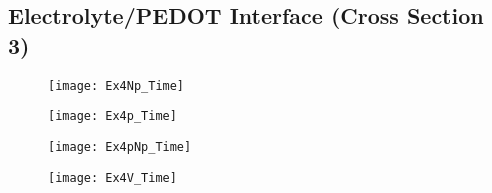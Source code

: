 \clearpage
\subsection{Electrolyte/PEDOT Interface (Cross Section 3) }


\begin{landscape}
\begin{figure}[!htp]
\centering
\texttt{[image: Ex4Np\_Time]}
\caption{} 
\label{}
\end{figure}
\end{landscape}

\begin{landscape}
\begin{figure}[!htp]
\centering
\texttt{[image: Ex4p\_Time]}
\caption{} 
\label{}
\end{figure}
\end{landscape}

\begin{landscape}
\begin{figure}[!htp]
\centering
\texttt{[image: Ex4pNp\_Time]}
\caption{} 
\label{}
\end{figure}
\end{landscape}

\begin{landscape}
\begin{figure}[!htp]
\centering
\texttt{[image: Ex4V\_Time]}
\caption{} 
\label{}
\end{figure}
\end{landscape}




